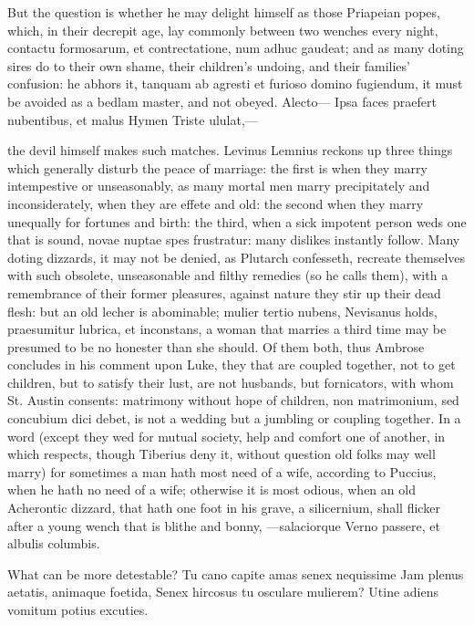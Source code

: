 {But the question is whether he may delight himself as those Priapeian
popes, which, in their decrepit age, lay commonly between two wenches
every night, contactu formosarum, et contrectatione, num adhuc gaudeat;
and as many doting sires do to their own shame, their children's
undoing, and their families' confusion: he abhors it, tanquam ab
agresti et furioso domino fugiendum, it must be avoided as a bedlam
master, and not obeyed.
Alecto---
Ipsa faces praefert nubentibus, et malus Hymen
Triste ululat,---

the devil himself makes such matches. Levinus Lemnius reckons up
three things which generally disturb the peace of marriage: the first
is when they marry intempestive or unseasonably, as many mortal men
marry precipitately and inconsiderately, when they are effete and old:
the second when they marry unequally for fortunes and birth: the third,
when a sick impotent person weds one that is sound, novae nuptae spes
frustratur: many dislikes instantly follow. Many doting dizzards, it
may not be denied, as Plutarch confesseth, recreate themselves
with such obsolete, unseasonable and filthy remedies (so he calls
them), with a remembrance of their former pleasures, against nature
they stir up their dead flesh: but an old lecher is abominable; mulier
tertio nubens, Nevisanus holds, praesumitur lubrica, et
inconstans, a woman that marries a third time may be presumed to be no
honester than she should. Of them both, thus Ambrose concludes in his
comment upon Luke, they that are coupled together, not to get
children, but to satisfy their lust, are not husbands, but fornicators,
with whom St. Austin consents: matrimony without hope of children, non
matrimonium, sed concubium dici debet, is not a wedding but a jumbling
or coupling together. In a word (except they wed for mutual society,
help and comfort one of another, in which respects, though
Tiberius deny it, without question old folks may well marry) for
sometimes a man hath most need of a wife, according to Puccius, when he
hath no need of a wife; otherwise it is most odious, when an old
Acherontic dizzard, that hath one foot in his grave, a silicernium,
shall flicker after a young wench that is blithe and bonny,
---salaciorque
Verno passere, et albulis columbis.

What can be more detestable?
Tu cano capite amas senex nequissime
Jam plenus aetatis, animaque foetida,
Senex hircosus tu osculare mulierem?
Utine adiens vomitum potius excuties.

}
